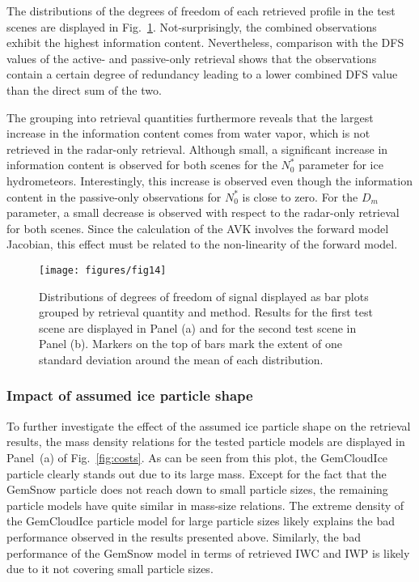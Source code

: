 \documentclass[journal abbreviation, manuscript]{copernicus}
\begin{document}
The distributions of the degrees of freedom of each retrieved profile in the
test scenes are displayed in Fig.~\ref{fig:dofs}. Not-surprisingly, the combined
observations exhibit the highest information content. Nevertheless, comparison
with the DFS values of the active- and passive-only retrieval shows that the
observations contain a certain degree of redundancy leading to a lower combined
DFS value than the direct sum of the two.

The grouping into retrieval quantities furthermore reveals that the largest
increase in the information content comes from water vapor, which is not
retrieved in the radar-only retrieval. Although small, a significant increase in
information content is observed for both scenes for the $N_0^*$ parameter for
ice hydrometeors. Interestingly, this increase is observed even though the
information content in the passive-only observations for $N_0^*$ is close to
zero. For the $D_m$ parameter, a small decrease is observed with respect to the
radar-only retrieval for both scenes. Since the calculation of the AVK involves
the forward model Jacobian, this effect must be related to the non-linearity of
the forward model.

\begin{figure}
\centering
\texttt{[image: figures/fig14]}
\caption{Distributions of degrees of freedom of signal displayed as bar plots
  grouped by retrieval quantity and method. Results for the first test scene are
  displayed in Panel (a) and for the second test scene in Panel (b). Markers on
  the top of bars mark the extent of one standard deviation around the mean of
  each distribution.}
\label{fig:dofs}
\end{figure}

\subsubsection{Impact of assumed ice particle shape}



To further investigate the effect of the assumed ice particle shape on the
retrieval results, the mass density relations for the tested particle models are
displayed in Panel~(a) of Fig.~\ref{fig:costs}. As can be seen from this plot,
the GemCloudIce particle clearly stands out due to its large mass. Except for
the fact that the GemSnow particle does not reach down to small particle sizes,
the remaining particle models have quite similar in mass-size relations. The
extreme density of the GemCloudIce particle model for large particle sizes likely
explains the bad performance observed in the results presented above. Similarly,
the bad performance of the GemSnow model in terms of retrieved IWC and IWP is likely
due to it not covering small particle sizes.
\end{document}
